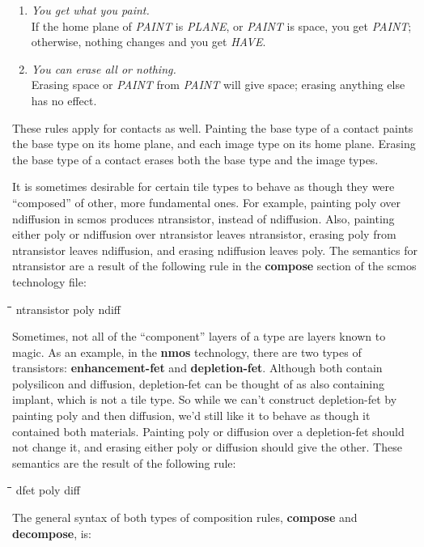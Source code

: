\documentclass[letterpaper,twoside,12pt]{article}
\def\hinch{\hspace*{0.5in}}
\def\starti{\begin{center}\begin{tabbing}\hinch\=\hinch\=\hinch\=\hinch\=\kill}
\def\endi{\end{tabbing}\end{center}}
\def\ii{\>\>\>}
\begin{document}
\begin{enumerate}
   \item {\itshape You get what you paint.} \\
	If the home plane of {\itshape PAINT} is {\itshape PLANE}, or
	{\itshape PAINT} is space, you get {\itshape PAINT}; otherwise, nothing
	changes and you get {\itshape HAVE}.
   \item {\itshape You can erase all or nothing.} \\
	Erasing space or {\itshape PAINT} from {\itshape PAINT} will give space;
	erasing anything else has no effect.
\end{enumerate}

These rules apply for contacts as well.
Painting the base type of a contact paints the base type
on its home plane, and each image type on its home plane.
Erasing the base type of a contact erases both the base type
and the image types.

It is sometimes desirable for certain tile types to behave as
though they were ``composed'' of other, more fundamental ones.
For example, painting poly over ndiffusion in scmos
produces ntransistor, instead of ndiffusion.
Also, painting either poly or ndiffusion
over ntransistor leaves ntransistor,
erasing poly from ntransistor leaves ndiffusion,
and erasing ndiffusion leaves poly.
The semantics for ntransistor
are a result of the following rule in the
{\bfseries compose} section of the scmos technology file:

\starti
   \ii {\bfseries compose} ntransistor poly ndiff
\endi

Sometimes, not all of the ``component'' layers of a type are layers
known to magic.
As an example, in the {\bfseries nmos} technology, there are two types
of transistors: {\bfseries enhancement-fet} and {\bfseries depletion-fet}.
Although both contain polysilicon and diffusion,
depletion-fet can be thought of as also containing
implant, which is not a tile type.
So while we can't construct depletion-fet by painting poly and then
diffusion, we'd still like it to behave as though it contained
both materials.
Painting poly or diffusion over a depletion-fet should not change it, and
erasing either poly or diffusion should give the other.
These semantics are the result of the following rule:

\starti
   \ii {\bfseries decompose} dfet poly diff
\endi

The general syntax of both types of composition rules,
{\bfseries compose} and {\bfseries decompose},
is:
\end{document}
